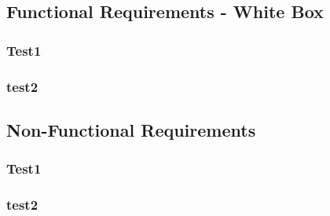 \documentclass{article}
\begin{document}
\subsection{Functional Requirements -  White Box}
\subsubsection{Test1}
\subsubsection{test2}
\subsection{Non-Functional Requirements}
\subsubsection{Test1}
\subsubsection{test2}
\end{document}
